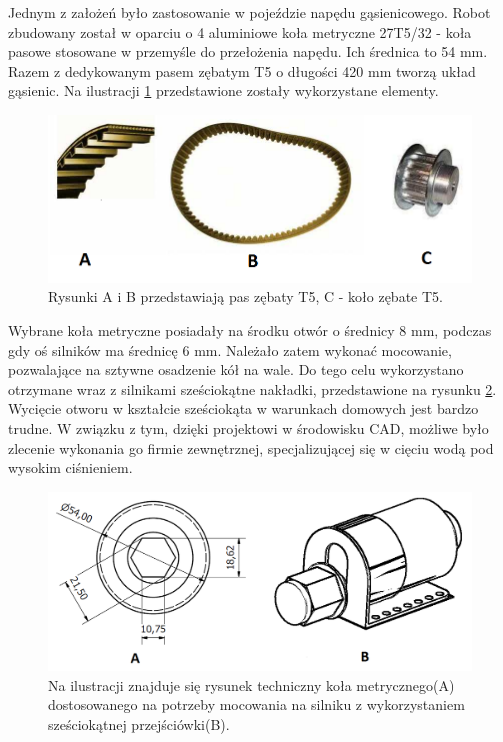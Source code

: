 Jednym z założeń było zastosowanie w pojeździe napędu gąsienicowego. Robot zbudowany został w oparciu o 4 aluminiowe koła metryczne 27T5/32 - koła pasowe stosowane w przemyśle do przełożenia napędu. Ich średnica to 54 mm. Razem z dedykowanym pasem zębatym T5 o długości 420 mm tworzą układ gąsienic. Na ilustracji \ref{gasienice_elementy} przedstawione zostały wykorzystane elementy.

  \begin{figure}[H]
    \begin{center}
      \includegraphics[scale=0.5]{imgs/gasienice.png}
 	\caption[Elementy gąsienic.]{\small{Rysunki A i B przedstawiają pas zębaty T5, C - koło zębate T5. }\footnotemark}
	\label{gasienice_elementy}
    \end{center}
  \end{figure}

Wybrane koła metryczne posiadały na środku otwór o średnicy 8 mm, podczas gdy oś silników ma średnicę 6 mm. Należało zatem wykonać mocowanie, pozwalające na sztywne osadzenie kół na wale. Do tego celu wykorzystano otrzymane wraz z silnikami sześciokątne nakładki, przedstawione na rysunku \ref{zamocowanie_szesciokatne}. Wycięcie otworu w kształcie sześciokąta w warunkach domowych jest bardzo trudne. W związku z tym, dzięki projektowi w środowisku CAD, możliwe było zlecenie wykonania go firmie zewnętrznej, specjalizującej się w cięciu wodą pod wysokim ciśnieniem.

  \begin{figure}[H]
    \begin{center}
      \includegraphics[scale=0.40]{imgs/moc_kol_tyl.png}
 	\caption[Model tylnych kół.]{\small{Na ilustracji znajduje się rysunek techniczny koła metrycznego(A) dostosowanego na potrzeby mocowania na silniku z wykorzystaniem sześciokątnej przejściówki(B).}}
	\label{zamocowanie_szesciokatne}
    \end{center}
  \end{figure}

